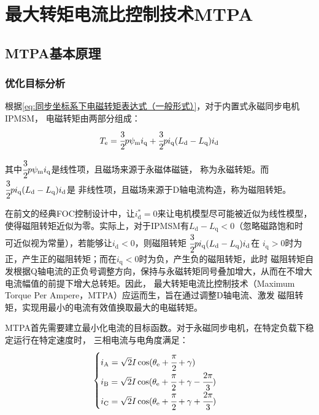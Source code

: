 \newpage
\section{最大转矩电流比控制技术MTPA}

\subsection{MTPA基本原理}
\subsubsection{优化目标分析}
根据\eqref{eq:同步坐标系下电磁转矩表达式（一般形式）}，对于内置式永磁同步电机IPMSM，
电磁转矩由两部分组成：
\begin{equation*}
    T_{\mathrm{e}}=\cfrac{3}{2}p\psi_{\mathrm{m}}i_{\mathrm{q}}+
    \cfrac{3}{2}pi_{\mathrm{q}}(L_{\mathrm{d}}-L_{\mathrm{q}})i_{\mathrm{d}}
\end{equation*}

其中\(\cfrac{3}{2}p\psi_{\mathrm{m}}i_{\mathrm{q}}\)是线性项，且磁场来源于永磁体磁链，
称为永磁转矩。而\(\cfrac{3}{2}pi_{\mathrm{q}}(L_{\mathrm{d}}-L_{\mathrm{q}})i_{\mathrm{d}}\)是
非线性项，且磁场来源于D轴电流构造，称为磁阻转矩。

在前文的经典FOC控制设计中，让\(i_{\mathrm{d}}^*=0\)来让电机模型尽可能被近似为线性模型，
使得磁阻转矩近似为零。实际上，对于IPMSM有\(L_{\mathrm{d}}-L_{\mathrm{q}}<0\)（忽略磁路饱和时
可近似视为常量），若能够让\(i_{\mathrm{d}}<0\)，则磁阻转矩
\(\cfrac{3}{2}pi_{\mathrm{q}}(L_{\mathrm{d}}-L_{\mathrm{q}})i_{\mathrm{d}}\)在
\(i_{\mathrm{q}}>0\)时为正，产生正的磁阻转矩；而在\(i_{\mathrm{q}}<0\)时为负，产生负的磁阻转矩，此时
磁阻转矩自发根据Q轴电流的正负号调整方向，保持与永磁转矩同号叠加增大，从而在不增大电流幅值的前提下增大总转矩。因此，
最大转矩电流比控制技术（Maximum Torque Per Ampere，MTPA）应运而生，旨在通过调整D轴电流、激发
磁阻转矩，实现用最小的电流有效值换取最大的电磁转矩。

MTPA首先需要建立最小化电流的目标函数。对于永磁同步电机，在特定负载下稳定运行在特定速度时，
三相电流与电角度满足：
\begin{equation*}
    \begin{cases}
        i_{\mathrm{A}}=\sqrt{2}I\cos(\theta_{\mathrm{e}}+\cfrac{\pi}{2}+\gamma)\\
        i_{\mathrm{B}}=\sqrt{2}I\cos(\theta_{\mathrm{e}}+\cfrac{\pi}{2}+\gamma-\cfrac{2\pi}{3})\\
        i_{\mathrm{C}}=\sqrt{2}I\cos(\theta_{\mathrm{e}}+\cfrac{\pi}{2}+\gamma+\cfrac{2\pi}{3})
    \end{cases}
\end{equation*}


